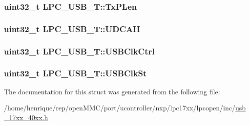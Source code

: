 \hypertarget{structLPC__USB__T_a0fca415ac09c2f6423d4981e1258ae22}{
\subsubsection[{Tx\-P\-Len}]{ uint32\-\_\-t L\-P\-C\-\_\-\-U\-S\-B\-\_\-\-T\-::\-Tx\-P\-Len}}\label{structLPC__USB__T_a0fca415ac09c2f6423d4981e1258ae22}
\hypertarget{structLPC__USB__T_aaea2d08c4ce519077848b1dc11f04d4c}{
\subsubsection[{U\-D\-C\-A\-H}]{ uint32\-\_\-t L\-P\-C\-\_\-\-U\-S\-B\-\_\-\-T\-::\-U\-D\-C\-A\-H}}\label{structLPC__USB__T_aaea2d08c4ce519077848b1dc11f04d4c}
\hypertarget{structLPC__USB__T_af45dceecc623dafb2281b7bf65b72c4d}{
\subsubsection[{U\-S\-B\-Clk\-Ctrl}]{ uint32\-\_\-t L\-P\-C\-\_\-\-U\-S\-B\-\_\-\-T\-::\-U\-S\-B\-Clk\-Ctrl}}\label{structLPC__USB__T_af45dceecc623dafb2281b7bf65b72c4d}
\hypertarget{structLPC__USB__T_a1ee9ca18d52cf4182b2a7508eb318ece}{
\subsubsection[{U\-S\-B\-Clk\-St}]{ uint32\-\_\-t L\-P\-C\-\_\-\-U\-S\-B\-\_\-\-T\-::\-U\-S\-B\-Clk\-St}}\label{structLPC__USB__T_a1ee9ca18d52cf4182b2a7508eb318ece}


The documentation for this struct was generated from the following file\-:\begin{DoxyCompactItemize}
\item 
/home/henrique/rep/open\-M\-M\-C/port/ucontroller/nxp/lpc17xx/lpcopen/inc/\hyperlink{usb__17xx__40xx_8h}{usb\-\_\-17xx\-\_\-40xx.\-h}\end{DoxyCompactItemize}
